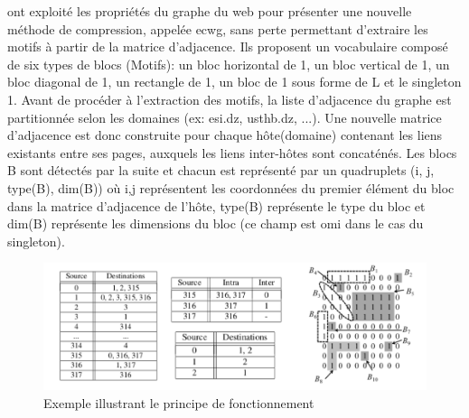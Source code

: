 
	\citep{asano2008efficient} ont exploité les propriétés du graphe du web pour présenter une nouvelle méthode de compression, appelée 
	\gls{ecwg}, sans perte permettant d'extraire les motifs à partir de la matrice d'adjacence. Ils proposent un vocabulaire composé de six types de blocs (Motifs): un bloc horizontal de 1, un bloc vertical de 1, un bloc diagonal de 1, un rectangle de 1, un bloc de 1 sous forme de L et le singleton 1. Avant de procéder à l'extraction des motifs, la liste d'adjacence du graphe est partitionnée selon les domaines (ex: esi.dz, usthb.dz, ...). Une nouvelle matrice d'adjacence est donc construite pour chaque hôte(domaine) contenant les liens existants entre ses pages, auxquels les liens inter-hôtes sont concaténés.
					Les blocs B sont détectés par la suite et chacun est représenté par un quadruplets (i, j, type(B), dim(B)) où i,j représentent les coordonnées du premier élément du bloc dans la matrice d'adjacence de l'hôte, type(B) représente le type du bloc et dim(B) représente les dimensions du bloc (ce champ est omi dans le cas du singleton). 
					\begin{figure}[h]
					\includegraphics[scale=0.5]{ressources/image/inter_intra.png} 
					\caption{Exemple illustrant le principe de fonctionnement \citep{asano2008efficient}}
					\label{interIntra}
				\end{figure}